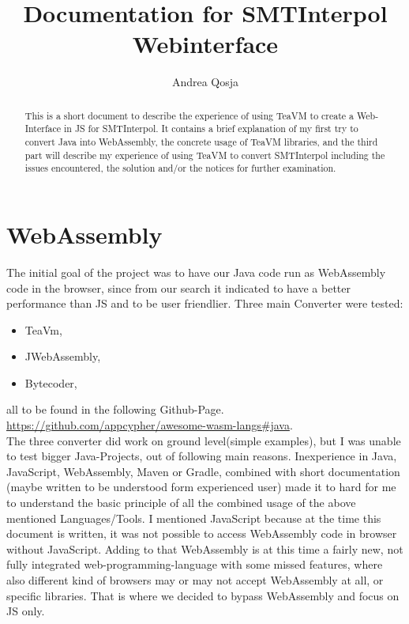 \documentclass[]{article}
\title{Documentation for SMTInterpol Webinterface}
\author{Andrea Qosja}
\begin{document}
\maketitle

\begin{abstract}
This is a short document to describe the experience of using TeaVM to create a Web-Interface in JS for SMTInterpol. It contains a brief explanation of my first try to convert Java into WebAssembly, the concrete usage of TeaVM libraries, and the third part will describe my experience of using TeaVM to convert SMTInterpol including the issues encountered, the solution and/or the notices for further examination.
\end{abstract}

\section{WebAssembly}

The initial goal of the project was to have our Java code run as WebAssembly code in the browser, since from our search it indicated to have a better performance than JS and to be user friendlier. Three main Converter were tested:
\begin{itemize} 
\item[] TeaVm,
\item[] JWebAssembly,
\item[] Bytecoder,
\end{itemize}
all to be found in the following Github-Page. \\ \href{https://github.com/appcypher/awesome-wasm-langs\#java}{https://github.com/appcypher/awesome-wasm-langs\#java}. \\
The three converter did work on ground level(simple examples), but I was unable to test bigger Java-Projects, out of following main reasons.
Inexperience in Java, JavaScript, WebAssembly, Maven or Gradle,
combined with short documentation (maybe written to be understood form experienced user) made it to hard for me to understand the basic principle of all the combined usage of the above mentioned Languages/Tools. I mentioned JavaScript because at the time this document is written, it was not possible to access WebAssembly code in browser without JavaScript. Adding to that WebAssembly is at this time a fairly new, not fully integrated web-programming-language with some missed features, where also different kind of browsers may or may not accept WebAssembly at all, or specific libraries. That is where we decided to bypass WebAssembly and focus on JS only.
\end{document}
